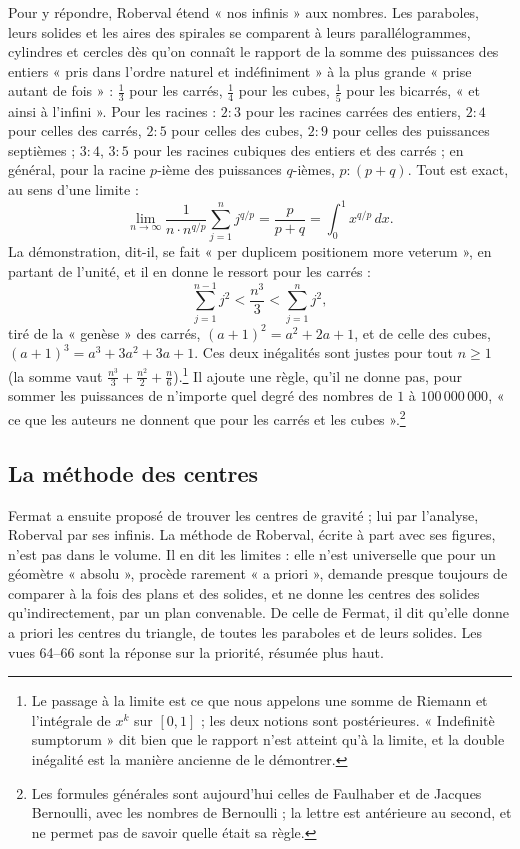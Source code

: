 \documentclass[11pt,a4paper]{article}
\begin{document}
Pour y répondre, Roberval étend « nos infinis » aux nombres. Les paraboles, leurs
solides et les aires des spirales se comparent à leurs parallélogrammes,
cylindres et cercles dès qu'on connaît le rapport de la somme des puissances des
entiers « pris dans l'ordre naturel et indéfiniment » à la plus grande « prise
autant de fois » : $\frac13$ pour les carrés, $\frac14$ pour les cubes, $\frac15$
pour les bicarrés, « et ainsi à l'infini ». Pour les racines : $2:3$ pour les
racines carrées des entiers, $2:4$ pour celles des carrés, $2:5$ pour celles des
cubes, $2:9$ pour celles des puissances septièmes ; $3:4$, $3:5$ pour les racines
cubiques des entiers et des carrés ; en général, pour la racine $p$-ième des
puissances $q$-ièmes, $p:(p+q)$. Tout est exact, au sens d'une limite :
\[
\lim_{n\to\infty}\frac{1}{n\cdot n^{q/p}}\sum_{j=1}^{n} j^{q/p} = \frac{p}{p+q}
= \int_0^1 x^{q/p}\,dx .
\]
La démonstration, dit-il, se fait « per duplicem positionem more veterum », en
partant de l'unité, et il en donne le ressort pour les carrés :
\[
\sum_{j=1}^{n-1} j^2 < \frac{n^3}{3} < \sum_{j=1}^{n} j^2 ,
\]
tiré de la « genèse » des carrés, $(a+1)^2 = a^2+2a+1$, et de celle des cubes,
$(a+1)^3 = a^3+3a^2+3a+1$. Ces deux inégalités sont justes pour tout $n\ge1$
(la somme vaut $\frac{n^3}{3}+\frac{n^2}{2}+\frac n6$).\footnote{Le passage à la
limite est ce que nous appelons une somme de Riemann et l'intégrale de $x^k$ sur
$[0,1]$ ; les deux notions sont postérieures. « Indefinitè sumptorum » dit bien
que le rapport n'est atteint qu'à la limite, et la double inégalité est la
manière ancienne de le démontrer.} Il ajoute une règle, qu'il ne donne pas, pour
sommer les puissances de n'importe quel degré des nombres de $1$ à $100\,000\,000$,
« ce que les auteurs ne donnent que pour les carrés et les cubes ».\footnote{Les
formules générales sont aujourd'hui celles de Faulhaber et de Jacques
Bernoulli, avec les nombres de Bernoulli ; la lettre est antérieure au second, et
ne permet pas de savoir quelle était sa règle.}

\subsection*{La méthode des centres}

Fermat a ensuite proposé de trouver les centres de gravité ; lui par l'analyse,
Roberval par ses infinis. La méthode de Roberval, écrite à part avec ses figures,
n'est pas dans le volume. Il en dit les limites : elle n'est universelle que pour
un géomètre « absolu », procède rarement « a priori », demande presque toujours
de comparer à la fois des plans et des solides, et ne donne les centres des
solides qu'indirectement, par un plan convenable. De celle de Fermat, il dit
qu'elle donne a priori les centres du triangle, de toutes les paraboles et de
leurs solides. Les vues 64--66 sont la réponse sur la priorité, résumée plus
haut.
\end{document}
